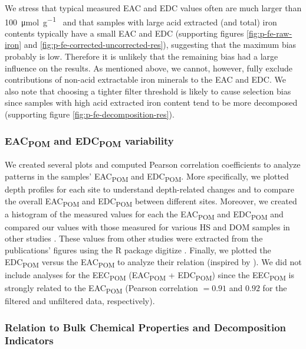 \documentclass[alpha-refs]{wiley-article-rmd}
\begin{document}
\begin{refsection}
We stress that typical measured EAC and EDC values often are much larger than \SI{100}{\micro\mol\per\gram\carbon} and that samples with large acid extracted (and total) iron contents typically have a small EAC and EDC (supporting figures \ref{fig:p-fe-raw-iron} and \ref{fig:p-fe-corrected-uncorrected-res}), suggesting that the maximum bias probably is low. Therefore it is unlikely that the remaining bias had a large influence on the results. As mentioned above, we cannot, however, fully exclude contributions of non-acid extractable iron minerals to the EAC and EDC. We also note that choosing a tighter filter threshold is likely to cause selection bias since samples with high acid extracted iron content tend to be more decomposed (supporting figure \ref{fig:p-fe-decomposition-res}).

\hypertarget{eac-and-edc-variability}{%
\subsubsection{\texorpdfstring{EAC\textsubscript{POM} and EDC\textsubscript{POM} variability}{EAC and EDC variability}}\label{eac-and-edc-variability}}

We created several plots and computed Pearson correlation coefficients to analyze patterns in the samples' EAC\textsubscript{POM} and EDC\textsubscript{POM}.
More specifically, we plotted depth profiles for each site to understand depth-related changes and to compare the overall EAC\textsubscript{POM} and EDC\textsubscript{POM} between different sites. Moreover, we created a histogram of the measured values for each the EAC\textsubscript{POM} and EDC\textsubscript{POM} and compared our values with those measured for various HS and DOM samples in other studies \autocite{Aeschbacher.2012,Tan.2017,Walpen.2018}. These values from other studies were extracted from the publications' figures using the R package digitize \autocite{Poisot.2011}. Finally, we plotted the EDC\textsubscript{POM} versus the EAC\textsubscript{POM} to analyze their relation (inspired by \textcite{Aeschbacher.2012}). We did not include analyses for the EEC\textsubscript{POM} (EAC\textsubscript{POM} + EDC\textsubscript{POM}) since the EEC\textsubscript{POM} is strongly related to the EAC\textsubscript{POM} (Pearson correlation \(=0.91\) and \(0.92\) for the filtered and unfiltered data, respectively).

\hypertarget{relation-to-bulk-chemical-properties-and-decomposition-indicators}{%
\subsubsection{Relation to Bulk Chemical Properties and Decomposition Indicators}\label{relation-to-bulk-chemical-properties-and-decomposition-indicators}}


\end{refsection}
\end{document}

